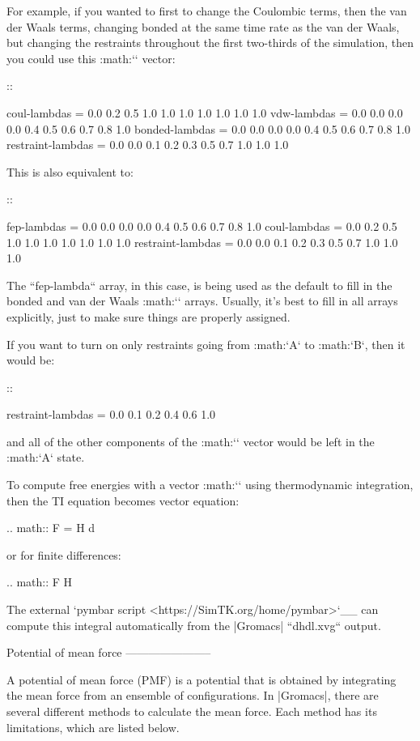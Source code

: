 For example, if you wanted to first to change the Coulombic terms, then
the van der Waals terms, changing bonded at the same time rate as the
van der Waals, but changing the restraints throughout the first
two-thirds of the simulation, then you could use this :math:`\lambda`
vector:

::

    coul-lambdas           = 0.0 0.2 0.5 1.0 1.0 1.0 1.0 1.0 1.0 1.0
    vdw-lambdas            = 0.0 0.0 0.0 0.0 0.4 0.5 0.6 0.7 0.8 1.0
    bonded-lambdas         = 0.0 0.0 0.0 0.0 0.4 0.5 0.6 0.7 0.8 1.0
    restraint-lambdas      = 0.0 0.0 0.1 0.2 0.3 0.5 0.7 1.0 1.0 1.0

This is also equivalent to:

::

    fep-lambdas            = 0.0 0.0 0.0 0.0 0.4 0.5 0.6 0.7 0.8 1.0
    coul-lambdas           = 0.0 0.2 0.5 1.0 1.0 1.0 1.0 1.0 1.0 1.0
    restraint-lambdas      = 0.0 0.0 0.1 0.2 0.3 0.5 0.7 1.0 1.0 1.0

The ``fep-lambda`` array, in this case, is being used as the
default to fill in the bonded and van der Waals :math:`\lambda` arrays.
Usually, it’s best to fill in all arrays explicitly, just to make sure
things are properly assigned.

If you want to turn on only restraints going from :math:`A` to
:math:`B`, then it would be:

::

    restraint-lambdas      = 0.0 0.1 0.2 0.4 0.6 1.0

and all of the other components of the :math:`\lambda` vector would be
left in the :math:`A` state.

To compute free energies with a vector :math:`\lambda` using
thermodynamic integration, then the TI equation becomes vector equation:

.. math:: \Delta F = \int \langle \nabla H \rangle \cdot d\vec{\lambda}

or for finite differences:

.. math:: \Delta F \approx \int \sum \langle \nabla H \rangle \cdot \Delta\lambda

The external `pymbar script <https://SimTK.org/home/pymbar>`__
can compute this integral automatically
from the |Gromacs| ``dhdl.xvg`` output.

Potential of mean force
-----------------------

A potential of mean force (PMF) is a potential that is obtained by
integrating the mean force from an ensemble of configurations. In
|Gromacs|, there are several different methods to calculate the mean
force. Each method has its limitations, which are listed below.

